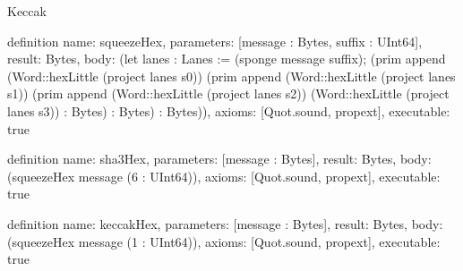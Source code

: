 \begin{lexlean}{Keccak}
\begin{semanticmodule}
definition{
  name: squeezeHex,
  parameters: [message : Bytes, suffix : UInt64],
  result: Bytes,
  body: (let lanes : Lanes := (sponge message suffix); (prim append (Word::hexLittle (project lanes s0)) (prim append (Word::hexLittle (project lanes s1)) (prim append (Word::hexLittle (project lanes s2)) (Word::hexLittle (project lanes s3)) : Bytes) : Bytes) : Bytes)),
  axioms: [Quot.sound, propext],
  executable: true
}

definition{
  name: sha3Hex,
  parameters: [message : Bytes],
  result: Bytes,
  body: (squeezeHex message (6 : UInt64)),
  axioms: [Quot.sound, propext],
  executable: true
}

definition{
  name: keccakHex,
  parameters: [message : Bytes],
  result: Bytes,
  body: (squeezeHex message (1 : UInt64)),
  axioms: [Quot.sound, propext],
  executable: true
}
\end{semanticmodule}
\end{lexlean}

